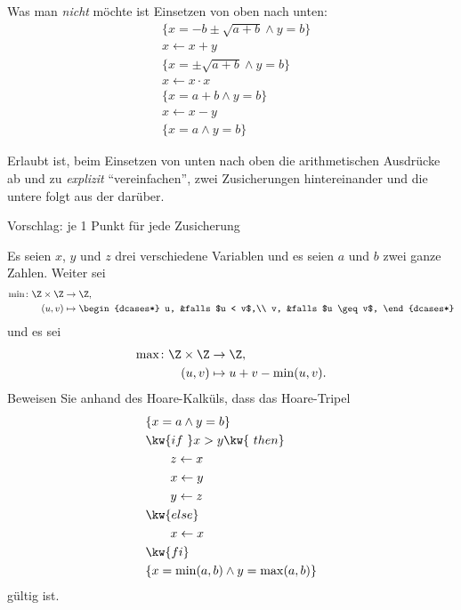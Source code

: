 \documentclass[12pt]{article}
\begin{document}
\begin{loesung}
  \begin{korrektur}
    Was man \emph{nicht} möchte ist Einsetzen von oben nach unten:
    \begin{align*}
      & \{ x = -b \pm \sqrt{a+b} \land y = b \} \\
      & x \gets x + y \\
      & \{ x = \pm \sqrt{a+b} \land y = b \} \\
      & x \gets x \cdot x \\
      & \{ x =  a+b \land y = b \} \\
      & x \gets x - y \\
      & \{ x = a \land y = b \}
    \end{align*}

    Erlaubt ist, beim Einsetzen von unten nach oben die arithmetischen
    Ausdrücke ab und zu \emph{explizit} "`vereinfachen"', \dh zwei
    Zusicherungen hintereinander und die untere folgt aus der darüber.

    Vorschlag: je 1 Punkt für jede Zusicherung
  \end{korrektur}

\end{loesung}


\begin{aufgabe}[6]
  Es seien $x$, $y$ und $z$ drei verschiedene Variablen und es seien $a$ und $b$ zwei ganze Zahlen. Weiter sei
  \begin{align*}
    \min \colon \Z \times \Z &\to     \Z,\\
                      (u, v) &\mapsto \begin{dcases*}
                                        u, &falls $u < v$,\\
                                        v, &falls $u \geq v$,
                                      \end{dcases*}
  \end{align*}
  und es sei
  \begin{align*}
    \max \colon \Z \times \Z &\to     \Z,\\
                      (u, v) &\mapsto u + v - \min(u, v).
  \end{align*}
  Beweisen Sie anhand des Hoare-Kalküls, dass das Hoare-Tripel
  \begin{align*}
    & \{ x = a \land y = b \} \\
    & \kw{if\ } x > y \kw{\ then} \\
    & \qquad z \gets x \\
    & \qquad x \gets y \\
    & \qquad y \gets z \\
    & \kw{else} \\
    & \qquad x \gets x \\
    & \kw{fi} \\
    & \{ x = \min(a, b) \land y = \max(a, b) \}
  \end{align*}
  gültig ist.
\end{aufgabe}
\end{document}
